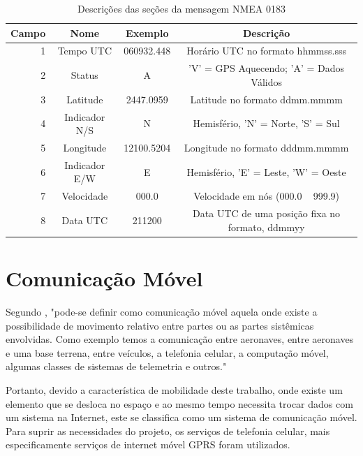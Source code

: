 \begin{table}[!h]
\centering
\begin{tabular}{|r|c|c|c|}
     \hline
		{\scriptsize \textbf{Campo}} &	{\scriptsize \textbf{Nome}} & {\scriptsize \textbf{Exemplo}} & {\scriptsize \textbf{Descrição}}\\
		\hline
		1 & {\scriptsize Tempo UTC} & {\scriptsize 060932.448} & {\scriptsize Horário UTC no formato hhmmss.sss}\\
		\hline
		2 & {\scriptsize Status} & {\scriptsize A} & {\scriptsize 'V' = GPS Aquecendo; 'A' = Dados Válidos}\\
		\hline
		3 & {\scriptsize Latitude} & {\scriptsize 2447.0959} & {\scriptsize Latitude no formato ddmm.mmmm}\\
		\hline
		4 & {\scriptsize Indicador N/S} & {\scriptsize N} & {\scriptsize Hemisfério, 'N' = Norte, 'S' = Sul}\\
		\hline
		5 & {\scriptsize Longitude} & {\scriptsize 12100.5204} & {\scriptsize Longitude no formato dddmm.mmmm} \\
		\hline
		6 & {\scriptsize Indicador E/W}  & {\scriptsize E} & {\scriptsize Hemisfério, 'E' = Leste, 'W' = Oeste} \\
		\hline
		7 & {\scriptsize Velocidade}  & {\scriptsize 000.0} & {\scriptsize Velocidade em nós (000.0 ~ 999.9)} \\
		\hline
		8 & {\scriptsize Data UTC} & {\scriptsize 211200} & {\scriptsize Data UTC de uma posição fixa no formato, ddmmyy}\\
		\hline
	\end{tabular}
\caption{Descrições das seções da mensagem NMEA 0183}
\end{table}

\section {Comunicação Móvel}

Segundo \textcite{inatel:1998}, "pode-se definir como comunicação móvel aquela onde existe a possibilidade de movimento relativo entre partes ou as partes sistêmicas envolvidas. Como exemplo temos a comunicação entre aeronaves, entre aeronaves e uma base terrena, entre veículos, a telefonia celular, a computação móvel, algumas classes de sistemas de telemetria e outros."

Portanto, devido a característica de mobilidade deste trabalho, onde existe um elemento que se desloca no espaço e ao mesmo tempo necessita trocar dados com um sistema na Internet, este se classifica como um sistema de comunicação móvel. Para suprir as necessidades do projeto, os serviços de telefonia celular, mais especificamente serviços de internet móvel GPRS foram utilizados.

